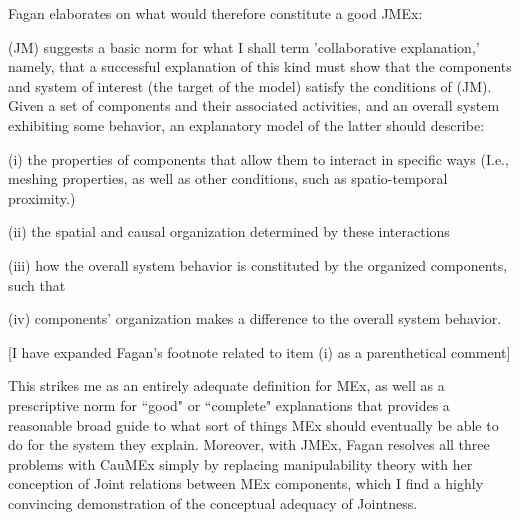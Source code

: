 Fagan elaborates on what would therefore constitute a good JMEx:

\begin{longquote}
(JM) suggests a basic norm for what I shall term 'collaborative
explanation,' namely, that a successful explanation of this kind must
show that the components and system of interest (the target of the
model) satisfy the conditions of (JM). Given a set of components and
their associated activities, and an overall system exhibiting some
behavior, an explanatory model of the latter should describe:

(i) the properties of components that allow them to interact in
specific ways (I.e., meshing properties, as well as other conditions, such as spatio-temporal proximity.)

(ii) the spatial and causal organization determined by these
interactions

(iii) how the overall system behavior is constituted by the
organized components, such that

(iv) components' organization makes a difference to the overall
system behavior.

[I have expanded Fagan's footnote related to item (i) as a parenthetical comment]
\cite{Fagan2015}
\end{longquote}

This strikes me as an entirely adequate definition for MEx, as well as a prescriptive norm for ``good" or ``complete" explanations that provides a reasonable broad guide to what sort of things MEx should eventually be able to do for the system they explain. Moreover, with JMEx, Fagan resolves all three problems with CauMEx simply by replacing manipulability theory with her conception of Joint relations between MEx components, which I find a highly convincing demonstration of the conceptual adequacy of Jointness.

